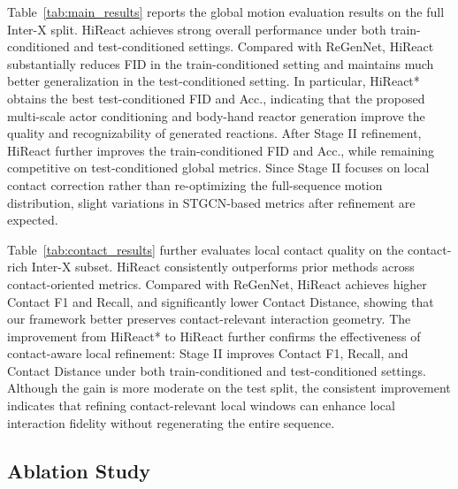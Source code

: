 \documentclass{article}
\begin{document}
Table~\ref{tab:main_results} reports the global motion evaluation results on the full Inter-X split. HiReact achieves strong overall performance under both train-conditioned and test-conditioned settings. Compared with ReGenNet, HiReact substantially reduces FID in the train-conditioned setting and maintains much better generalization in the test-conditioned setting. In particular, HiReact* obtains the best test-conditioned FID and Acc., indicating that the proposed multi-scale actor conditioning and body-hand reactor generation improve the quality and recognizability of generated reactions. After Stage II refinement, HiReact further improves the train-conditioned FID and Acc., while remaining competitive on test-conditioned global metrics. Since Stage II focuses on local contact correction rather than re-optimizing the full-sequence motion distribution, slight variations in STGCN-based metrics after refinement are expected.

Table~\ref{tab:contact_results} further evaluates local contact quality on the contact-rich Inter-X subset. HiReact consistently outperforms prior methods across contact-oriented metrics. Compared with ReGenNet, HiReact achieves higher Contact F1 and Recall, and significantly lower Contact Distance, showing that our framework better preserves contact-relevant interaction geometry. The improvement from HiReact* to HiReact further confirms the effectiveness of contact-aware local refinement: Stage II improves Contact F1, Recall, and Contact Distance under both train-conditioned and test-conditioned settings. Although the gain is more moderate on the test split, the consistent improvement indicates that refining contact-relevant local windows can enhance local interaction fidelity without regenerating the entire sequence.


















\subsection{Ablation Study}
\end{document}
